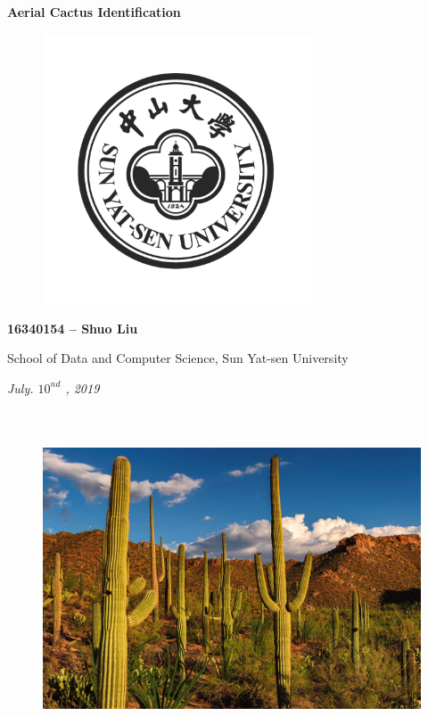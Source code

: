 \documentclass[a4paper]{article}
\begin{document}
\vspace{6mm}
\begin{center}
\Huge\textbf{Aerial Cactus Identification}
\end{center}
\vspace{3mm}

\begin{figure}[h]
\centering
\includegraphics[width=8cm,height=8cm]{sysu.png}
\end{figure}

\begin{center}
\large\textbf{16340154 --  Shuo Liu }\\
\end{center}

\begin{center}
\normalsize{School of Data and Computer Science, Sun Yat-sen University}
\end{center}

\begin{center}
\textit{July. $10^{nd}$ \textit, 2019\\}
\end{center}
\vspace{6mm}

\begin{figure}[H]
\centering
\includegraphics[width=15cm,height=10cm]{cactus.png}
\end{figure}
\clearpage
\end{document}
